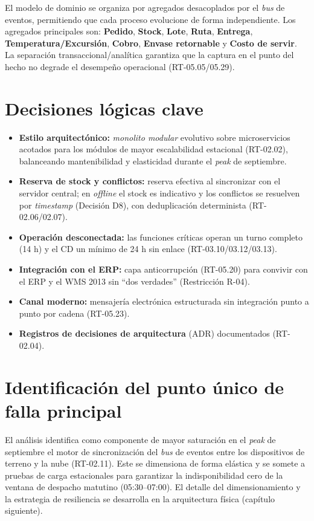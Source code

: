 El modelo de dominio se organiza por agregados desacoplados por el \emph{bus} de eventos,
permitiendo que cada proceso evolucione de forma independiente. Los agregados principales
son: \textbf{Pedido}, \textbf{Stock}, \textbf{Lote}, \textbf{Ruta}, \textbf{Entrega},
\textbf{Temperatura/Excursión}, \textbf{Cobro}, \textbf{Envase retornable} y
\textbf{Costo de servir}. La separación transaccional/analítica garantiza que la captura
en el punto del hecho no degrade el desempeño operacional (RT-05.05/05.29).


\section{Decisiones lógicas clave}

\begin{itemize}
  \item \textbf{Estilo arquitectónico:} \emph{monolito modular} evolutivo sobre
        microservicios acotados para los módulos de mayor escalabilidad estacional
        (RT-02.02), balanceando mantenibilidad y elasticidad durante el \emph{peak} de
        septiembre.
  \item \textbf{Reserva de stock y conflictos:} reserva efectiva al sincronizar con el
        servidor central; en \emph{offline} el stock es indicativo y los conflictos se
        resuelven por \emph{timestamp} (Decisión D8), con deduplicación determinista
        (RT-02.06/02.07).
  \item \textbf{Operación desconectada:} las funciones críticas operan un turno completo
        (14 h) y el CD un mínimo de 24 h sin enlace (RT-03.10/03.12/03.13).
  \item \textbf{Integración con el ERP:} capa anticorrupción (RT-05.20) para convivir
        con el ERP y el WMS 2013 sin ``dos verdades'' (Restricción R-04).
  \item \textbf{Canal moderno:} mensajería electrónica estructurada sin integración
        punto a punto por cadena (RT-05.23).
  \item \textbf{Registros de decisiones de arquitectura} (ADR) documentados (RT-02.04).
\end{itemize}

\section{Identificación del punto único de falla principal}

El análisis identifica como componente de mayor saturación en el \emph{peak} de
septiembre el motor de sincronización del \emph{bus} de eventos entre los dispositivos de
terreno y la nube (RT-02.11). Este se dimensiona de forma elástica y se somete a pruebas
de carga estacionales para garantizar la indisponibilidad cero de la ventana de despacho
matutino (05:30--07:00). El detalle del dimensionamiento y la estrategia de resiliencia se
desarrolla en la arquitectura física (capítulo siguiente).
